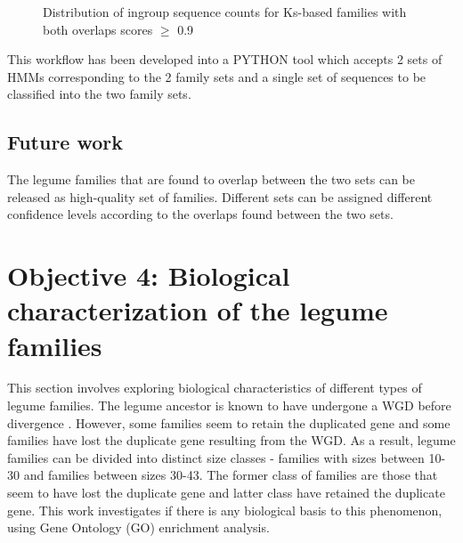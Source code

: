 \documentclass{article}
\begin{document}
		\begin{figure}[h!]
			\caption{Distribution of ingroup sequence counts for Ks-based families with both overlaps scores $\geq$ 0.9 }
			\label{fig:hist_seq_ct_lgf5_vs_orthofinder_90percent_overlap}
		\end{figure}
		
		This workflow has been developed into a PYTHON tool which accepts 2 sets of HMMs corresponding to the 2 family sets and a single set of sequences to be classified into the two family sets.
		
		\subsection{Future work}
		The legume families that are found to overlap between the two sets can be released as high-quality set of families. Different sets can be assigned different confidence levels according to the overlaps found between the two sets.
	
	\pagebreak
	\section{Objective 4: Biological characterization of the legume families}
	This section involves exploring biological characteristics of different types of legume families. The legume ancestor is known to have undergone a WGD before divergence \citep{cannon2014multiple}.  However, some families seem to retain the duplicated gene and some families have lost the duplicate gene resulting from the WGD. As a result, legume families can be divided into distinct size classes - families with sizes between 10-30 and families between sizes 30-43. The former class of families are those that seem to have lost the duplicate gene and latter class have retained the duplicate gene. This work investigates if there is any biological basis to this phenomenon, using Gene Ontology (GO) enrichment analysis. 
	
\end{document}
